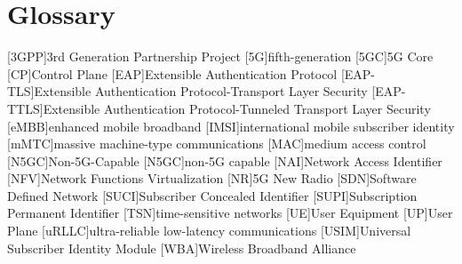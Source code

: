 \chapter{Glossary}

\footnotesize
\SingleSpacing

\begin{acronym}[AAAAAA]
	[3GPP]{3rd Generation Partnership Project}
	[5G]{fifth-generation}
	[5GC]{5G Core}
	[CP]{Control Plane}
	[EAP]{Extensible Authentication Protocol}
	[EAP-TLS]{Extensible Authentication Protocol-Transport Layer Security}
	[EAP-TTLS]{Extensible Authentication Protocol-Tunneled Transport Layer Security}
	[eMBB]{enhanced mobile broadband}
	[IMSI]{international mobile subscriber identity}
	[mMTC]{massive machine-type communications}
	[MAC]{medium access control}
	[N5GC]{Non-5G-Capable}
	[N5GC]{non-5G capable}
	[NAI]{Network Access Identifier}
	[NFV]{Network Functions Virtualization}
	[NR]{5G New Radio}
	[SDN]{Software Defined Network}
	[SUCI]{Subscriber Concealed Identifier}
	[SUPI]{Subscription Permanent Identifier}
	[TSN]{time-sensitive networks}
	[UE]{User Equipment}
	[UP]{User Plane}
	[uRLLC]{ultra-reliable low-latency communications}
	[USIM]{Universal Subscriber Identity Module}
	[WBA]{Wireless Broadband Alliance}
\end{acronym}